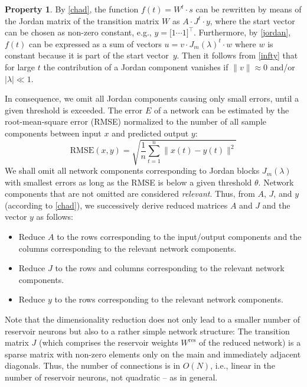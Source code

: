 \documentclass[preprint,12pt,times,authoryear]{elsarticle}%
\theoremstyle{definition}
\newtheorem{prop}{Property}
\begin{document}
\begin{prop}
By \cref{chad}, the function $f(t) = W^t \cdot s$ can be rewritten by
means of the Jordan matrix of the transition matrix $W$ as $A \cdot J^t
\cdot y$, where the start vector can be chosen as non-zero constant, e.g., $y =
\big[ 1 \cdots 1 \big]^\top$. Furthermore, by \cref{jordan}, $f(t)$ can be
expressed as a sum of vectors $u = v \cdot J_m(\lambda)^t \cdot w$ where $w$ is
constant because it is part of the start vector~$y$. Then it follows from
\cref{infty} that for large $t$ the contribution of a Jordan component
vanishes if $\|v\| \approx 0$ and/or $|\lambda| \ll 1$.

In consequence, we omit all Jordan components causing only small errors, until a
given threshold is exceeded. The error $E$ of a network can be estimated by the
root-mean-square error (RMSE) normalized to the number of all sample components
between input $x$ and predicted output $y$:
  \[ \mathrm{RMSE}(x,y) = \sqrt{\frac{1}{n} \sum_{t=1}^n \big\|x(t)-y(t)\big\|^2} \]
We shall omit all network components corresponding to Jordan blocks
$J_m(\lambda)$ with smallest errors as long as the
RMSE is below a given threshold $\theta$. Network components that are not
omitted are considered \emph{relevant}. Thus, from $A$, $J$, and
$y$ (according to \cref{chad}), we successively derive reduced matrices
$A$ and $J$ and the vector $y$ as follows:
\begin{itemize}
  \item Reduce $A$ to the rows corresponding to the input/output components and
	the columns corresponding to the relevant network components.
  \item Reduce $J$ to the rows and columns corresponding to the relevant
	network components.
  \item Reduce $y$ to the rows corresponding to the relevant network components.
\end{itemize}
\end{prop}

Note that the dimensionality reduction does not only lead to a smaller number of
reservoir neurons but also to a rather simple network structure: The transition
matrix $J$ (which comprises the reservoir weights $W^\mathrm{res}$ of
the reduced network) is a sparse matrix with non-zero elements only on the main
and immediately adjacent diagonals. Thus, the number of connections is in
$O(N)$, i.e., linear in the number of reservoir neurons, not quadratic -- as in
general.
\end{document}
